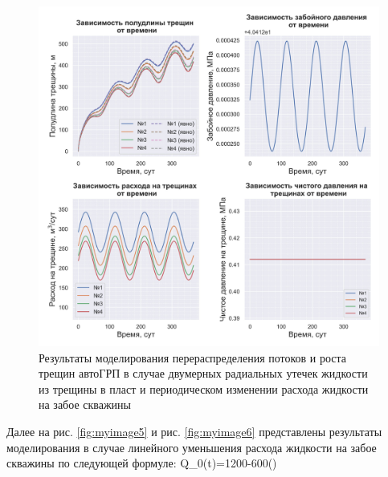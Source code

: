 \begin{figure}[H] 
\center
\includegraphics[width=\linewidth]{images/myimage4.jpg}
\caption{Результаты моделирования перераспределения потоков и роста трещин автоГРП в случае двумерных радиальных утечек жидкости из трещины в пласт и периодическом изменении расхода жидкости на забое скважины}
\label{fig:myimage4}
\end{figure}

Далее на рис. \ref{fig:myimage5} и рис. \ref{fig:myimage6} представлены результаты моделирования в случае линейного уменьшения расхода жидкости на забое скважины по следующей формуле:
\beq
Q_0(t)=1200-600\cdot\left(\right)
\eeq

